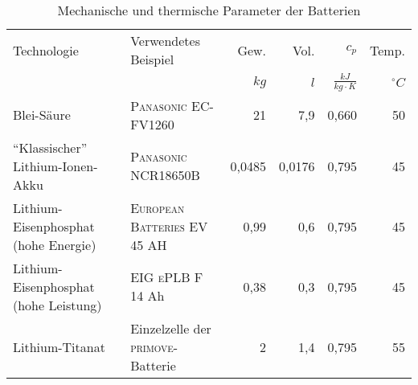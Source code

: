 \begin{table}[h]\centering
	\begin{tabulary}{\textwidth}{LLrrrr}
		\toprule
		Technologie                           & Verwendetes Beispiel                      &   Gew. &   Vol. &                  $c_p$ &       Temp. \\
		                                      &                                           &   $kg$ &    $l$ & $\frac{kJ}{kg\cdot K}$ & $^{\circ}C$ \\ \midrule
		Blei-Säure                            & \textsc{Panasonic} EC-FV1260              &     21 &    7,9 &                  0,660 &          50 \\
		"`Klassischer"' Lithium-Ionen-Akku    & \textsc{Panasonic} NCR18650B              & 0,0485 & 0,0176 &                  0,795 &          45 \\
		Lithium-Eisenphosphat (hohe Energie)  & \textsc{European Batteries} EV 45 AH      &   0,99 &    0,6 &                  0,795 &          45 \\
		Lithium-Eisenphosphat (hohe Leistung) & \textsc{EIG ePLB} F 14 Ah                 &   0,38 &    0,3 &                  0,795 &          45 \\
		Lithium-Titanat                       & Einzelzelle der \textsc{primove}-Batterie &      2 &    1,4 &                  0,795 &          55 \\ \bottomrule
	\end{tabulary}
	\caption{Mechanische und thermische Parameter der Batterien}
	\label{vergleichstabellen_speichertechnologien_2}
\end{table}

